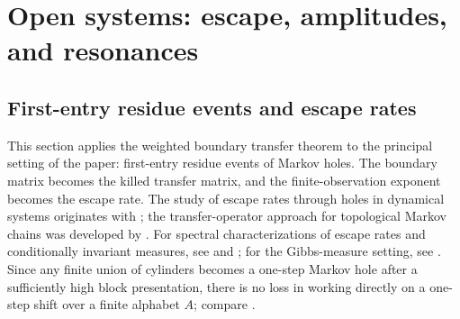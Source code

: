 \section{Open systems: escape, amplitudes, and resonances}
\label{sec:open-system}

\subsection{First-entry residue events and escape rates}

This section applies the weighted boundary transfer theorem to the
principal setting of the paper: first-entry residue events of Markov
holes.  The boundary matrix becomes the killed transfer matrix, and the
finite-observation exponent becomes the escape rate.  The study of
escape rates through holes in dynamical systems originates with
\citet{PianigianiYorke1979}; the transfer-operator approach for
topological Markov chains was developed by
\citet{ColletMartinezSchmitt1997}.  For spectral characterizations of
escape rates and conditionally invariant measures, see
\citet{DemersYoung2006,DemersWrightYoung2012} and
\citet{KellerLiverani2009}; for the Gibbs-measure setting, see
\citet{FergusonPollicott2012}.  Since any finite union of cylinders
becomes a one-step Markov hole after a sufficiently high block
presentation, there is no loss in working directly on a one-step shift
over a finite alphabet \(A\); compare \citet{LindMarcus1995,Bowen2008}.

